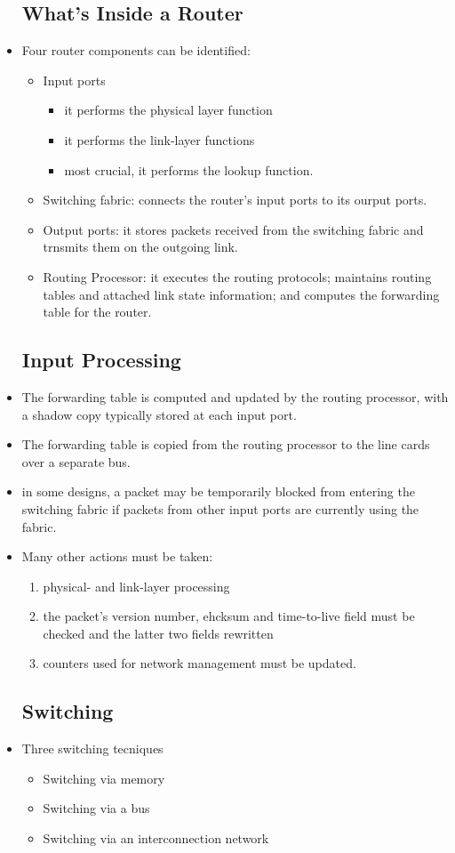 \message{ !name(chapter4.tex)}\documentclass{article}
\begin{document}
\begin{itemize}
\subsection{What's Inside a Router}
\item Four router components can be identified:
\begin{itemize}
\item Input ports
\begin{itemize}
\item it performs the physical layer function
\item it performs the link-layer functions
\item most crucial, it performs the lookup function.
\end{itemize}
\item Switching fabric: connects the router's input ports to its
  ourput ports.
\item Output ports: it stores packets received from the switching
  fabric and trnsmits them on the outgoing link.
\item Routing Processor: it executes the routing protocols; maintains
  routing tables and attached link state information; and computes the
  forwarding table for the router.
\end{itemize}
\subsection{Input Processing}
\item The forwarding table is computed and updated by the routing
  processor, with a shadow copy typically stored at each input port.
\item The forwarding table is copied from the routing processor to the
  line cards over a separate bus.
\item in some designs, a packet may be temporarily blocked from
  entering the switching fabric if packets from other input ports are
  currently using the fabric.
\item Many other actions must be taken:
\begin{enumerate}
\item physical- and link-layer processing
\item the packet's version number, ehcksum and time-to-live field must
  be checked and the latter two fields rewritten
\item counters used for network management must be updated.
\end{enumerate}
\subsection{Switching}
\item Three switching tecniques
\begin{itemize}
\item Switching via memory
\item Switching via a bus
\item Switching via an interconnection network
\end{itemize}

\end{itemize}
\end{document}
